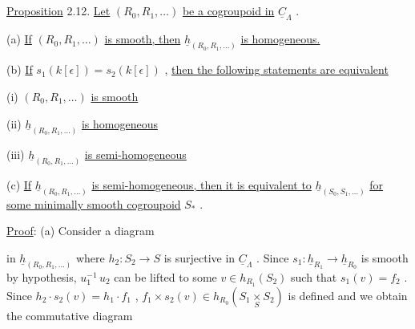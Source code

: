 \underline{Proposition} 2.12.  \underline{Let}  $(R_0,R_1,\ldots)$  \underline{be a cogroupoid in}  $\hat{\underline{C}}_\Lambda$ .

(a)  \underline{If}  $(R_0,R_1,\ldots)$  \underline{is smooth, then}  $\underline{h}_{(R_0,R_1,\ldots)}$  \underline{is homogeneous.}

(b)  \underline{If}  $s_1(k[\epsilon]) = s_2(k[\epsilon])$  , \underline{then the following statements are equivalent}

          (i)  $(R_0,R_1,\ldots)$  \underline{is smooth}

         (ii)  $\underline{h}_{(R_0,R_1,\ldots)}$  \underline{is homogeneous}

        (iii)  $\underline{h}_{(R_0,R_1,\ldots)}$  \underline{is semi-homogeneous}



(c)  \underline{If}  $\underline{h}_{(R_0,R_1,\ldots)}$  \underline{is semi-homogeneous, then it is equivalent to}  $\underline{h}_{(S_0,S_1,\ldots)}$  \underline{for some minimally smooth cogroupoid}  $S_*$  .

\underline{Proof}:   (a)  Consider a diagram

\begin{center}
\end{center}
in  $\underline{h}_{(R_0,R_1,\ldots)}$  where  $h_2 : S_2 \longrightarrow S$  is surjective in  $\underline{C}_\Lambda$ . Since $s_1 : \underline{h}_{R_1} \longrightarrow \underline{h}_{R_0}$  is smooth by hypothesis,  $u_1^{-1}\, u_2$  can be lifted to some $v \in h_{R_1}(S_2)$  such that  $s_1(v) = f_2$ . Since  $h_2 \cdot s_2(v) = h_1 \cdot f_1$ , $f_1 \times s_2(v) \in h_{R_0}(S_1 \underset{S}{\times} S_2)$  is defined and we obtain the commutative diagram

